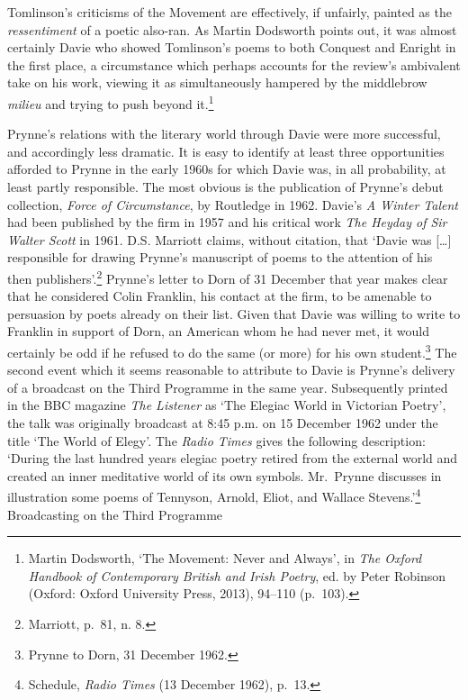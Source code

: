 \documentclass[]{article}
\begin{document}
\noindent Tomlinson's criticisms of the Movement are effectively, if
unfairly, painted as the \emph{ressentiment} of a poetic also-ran. As
Martin Dodsworth points out, it was almost certainly Davie who showed
Tomlinson's poems to both Conquest and Enright in the first place, a
circumstance which perhaps accounts for the review's ambivalent take on
his work, viewing it as simultaneously hampered by the middlebrow
\emph{milieu} and trying to push beyond it.\footnote{Martin Dodsworth,
  `The Movement: Never and Always', in \emph{The Oxford Handbook of
  Contemporary British and Irish Poetry}, ed. by Peter Robinson (Oxford:
  Oxford University Press, 2013), 94--110 (p.~103).}

Prynne's relations with the literary world through Davie were more
successful, and accordingly less dramatic. It is easy to identify at
least three opportunities afforded to Prynne in the early 1960s for
which Davie was, in all probability, at least partly responsible. The
most obvious is the publication of Prynne's debut collection,
\emph{Force of Circumstance}, by Routledge in 1962. Davie's \emph{A
Winter Talent} had been published by the firm in 1957 and his critical
work \emph{The Heyday of Sir Walter Scott} in 1961. D.S. Marriott
claims, without citation, that `Davie was {[}\ldots{}{]} responsible for
drawing Prynne's manuscript of poems to the attention of his then
publishers'.\footnote{Marriott, p.~81, n. 8.} Prynne's letter to Dorn of
31 December that year makes clear that he considered Colin Franklin, his
contact at the firm, to be amenable to persuasion by poets already on
their list. Given that Davie was willing to write to Franklin in support
of Dorn, an American whom he had never met, it would certainly be odd if
he refused to do the same (or more) for his own student.\footnote{Prynne
  to Dorn, 31 December 1962.} The second event which it seems reasonable
to attribute to Davie is Prynne's delivery of a broadcast on the Third
Programme in the same year. Subsequently printed in the BBC magazine
\emph{The Listener} as `The Elegiac World in Victorian Poetry', the talk
was originally broadcast at 8:45 p.m. on 15 December 1962 under the
title `The World of Elegy'. The \emph{Radio Times} gives the following
description: `During the last hundred years elegiac poetry retired from
the external world and created an inner meditative world of its own
symbols. Mr.~Prynne discusses in illustration some poems of Tennyson,
Arnold, Eliot, and Wallace Stevens.'\footnote{Schedule, \emph{Radio
  Times} (13 December 1962), p.~13.} Broadcasting on the Third Programme
\end{document}
